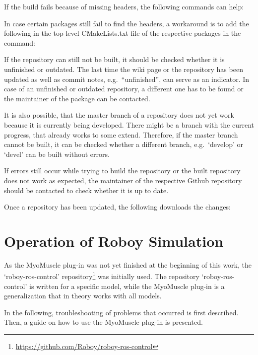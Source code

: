 If the build fails because of missing headers, the following commands can help:

In case certain packages still fail to find the headers, a workaround is to add the following in the top level CMakeLists.txt file of the respective packages in the  command:

If the repository can still not be built, it should be checked whether it is unfinished or outdated. The last time the wiki page or the repository has been updated as well as commit notes, e.g.\ “unfinished”, can serve as an indicator. In case of an unfinished or outdated repository, a different one has to be found or the maintainer of the package can be contacted.

It is also possible, that the master branch of a repository does not yet work because it is currently being developed. There might be a branch with the current progress, that already works to some extend. Therefore, if the master branch cannot be built, it can be checked whether a different branch, e.g.\ `develop' or `devel' can be built without errors.

If errors still occur while trying to build the repository or the built repository does not work as expected, the maintainer of the respective Github repository should be contacted to check whether it is up to date.

Once a repository has been updated, the following downloads the changes:


\section{Operation of Roboy Simulation}
As the MyoMuscle plug-in was not yet finished at the beginning of this work, the ‘roboy-ros-control’ repository\footnote{\url{https://github.com/Roboy/roboy-ros-control}} was initially used. The repository `roboy-ros-control' is written for a specific model, while the MyoMuscle plug-in is a generalization that in theory works with all models\cite{BA}.%

In the following, troubleshooting of problems that occurred is first described. Then, a guide on how to use the MyoMuscle plug-in is presented.

